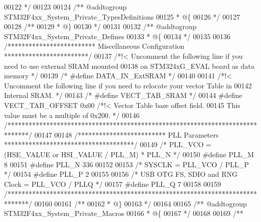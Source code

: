 \begin{DoxyCode}
00122 \textcolor{comment}{  */}
00123 
00124 \textcolor{comment}{/** @addtogroup STM32F4xx\_System\_Private\_TypesDefinitions}
00125 \textcolor{comment}{  * @\{}
00126 \textcolor{comment}{  */}
00127 
00128 \textcolor{comment}{/**}
00129 \textcolor{comment}{  * @\}}
00130 \textcolor{comment}{  */}
00131 
00132 \textcolor{comment}{/** @addtogroup STM32F4xx\_System\_Private\_Defines}
00133 \textcolor{comment}{  * @\{}
00134 \textcolor{comment}{  */}
00135 
00136 \textcolor{comment}{/************************* Miscellaneous Configuration ************************/}
00137 \textcolor{comment}{/*!< Uncomment the following line if you need to use external SRAM mounted}
00138 \textcolor{comment}{     on STM324xG\_EVAL board as data memory  */}
00139 \textcolor{comment}{/* #define DATA\_IN\_ExtSRAM */}
00140 
00141 \textcolor{comment}{/*!< Uncomment the following line if you need to relocate your vector Table in}
00142 \textcolor{comment}{     Internal SRAM. */}
00143 \textcolor{comment}{/* #define VECT\_TAB\_SRAM */}
00144 \textcolor{preprocessor}{#}\textcolor{preprocessor}{define} \textcolor{preprocessor}{VECT\_TAB\_OFFSET}  0x00 \textcolor{comment}{/*!< Vector Table base offset field. }
00145 \textcolor{comment}{                                   This value must be a multiple of 0x200. */}
00146 \textcolor{comment}{/******************************************************************************/}
00147 
00148 \textcolor{comment}{/************************* PLL Parameters *************************************/}
00149 \textcolor{comment}{/* PLL\_VCO = (HSE\_VALUE or HSI\_VALUE / PLL\_M) * PLL\_N */}
00150 \textcolor{preprocessor}{#}\textcolor{preprocessor}{define} \textcolor{preprocessor}{PLL\_M}      8
00151 \textcolor{preprocessor}{#}\textcolor{preprocessor}{define} \textcolor{preprocessor}{PLL\_N}      336
00152 
00153 \textcolor{comment}{/* SYSCLK = PLL\_VCO / PLL\_P */}
00154 \textcolor{preprocessor}{#}\textcolor{preprocessor}{define} \textcolor{preprocessor}{PLL\_P}      2
00155 
00156 \textcolor{comment}{/* USB OTG FS, SDIO and RNG Clock =  PLL\_VCO / PLLQ */}
00157 \textcolor{preprocessor}{#}\textcolor{preprocessor}{define} \textcolor{preprocessor}{PLL\_Q}      7
00158 
00159 \textcolor{comment}{/******************************************************************************/}
00160 
00161 \textcolor{comment}{/**}
00162 \textcolor{comment}{  * @\}}
00163 \textcolor{comment}{  */}
00164 
00165 \textcolor{comment}{/** @addtogroup STM32F4xx\_System\_Private\_Macros}
00166 \textcolor{comment}{  * @\{}
00167 \textcolor{comment}{  */}
00168 
00169 \textcolor{comment}{/**}

\end{DoxyCode}
